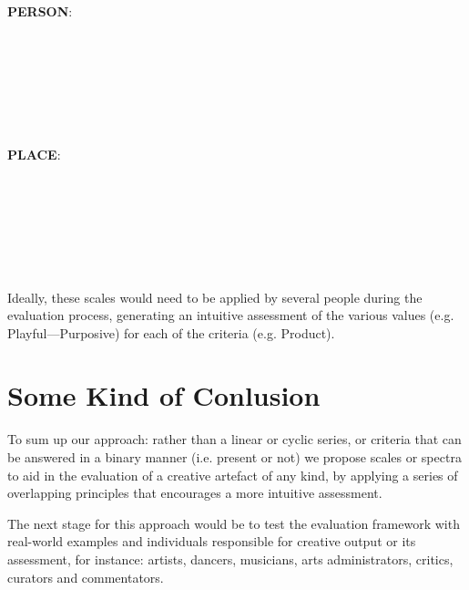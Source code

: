 \noindent \textbf{PERSON}:\\
  \\
  \\
  \\
  \\
  \\
  \\
  \\

\noindent \textbf{PLACE}:\\
  \\
  \\
  \\
  \\
  \\
  \\
  \\

Ideally, these scales would need to be applied by several people during the evaluation process, generating an intuitive assessment of the various values (e.g. Playful---Purposive) for each of the criteria (e.g. Product).


\section{Some Kind of Conlusion}



To sum up our approach: rather than a linear or cyclic series, or criteria that can be answered in a binary manner (i.e. present or not) we propose scales or spectra to aid in the evaluation of a creative artefact of any kind, by applying a series of overlapping principles that encourages a more intuitive assessment.

The next stage for this approach would be to test the evaluation framework with real-world examples and individuals responsible for creative output or its assessment, for instance: artists, dancers, musicians, arts administrators, critics, curators and commentators.

